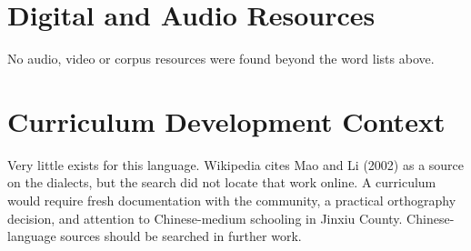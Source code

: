 \documentclass[12pt]{article}
\begin{document}
\section{Digital and Audio Resources}
No audio, video or corpus resources were found beyond the word lists above.

\section{Curriculum Development Context}
Very little exists for this language. Wikipedia cites Mao and Li (2002) as a source on the dialects, but the search did not locate that work online. A curriculum would require fresh documentation with the community, a practical orthography decision, and attention to Chinese-medium schooling in Jinxiu County. Chinese-language sources should be searched in further work.
\end{document}
